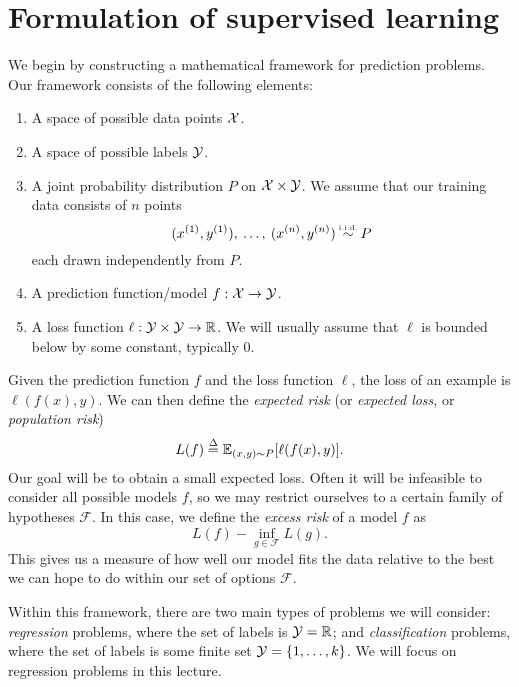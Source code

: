 \documentclass[]{subook}
\newcommand\iid{\stackrel{\mathclap{\tiny\normalfont\mbox{i.i.d.}}}{\sim}}
\newcommand\defn{\stackrel{\mathclap{\tiny\Delta}}{=}}
\newcommand\E{\mathbb{E}}
\begin{document}
\section{Formulation of supervised learning}
We begin by constructing a mathematical framework for prediction problems. Our framework consists of the following elements:
\begin{enumerate}
	\item A space of possible data points $\mathcal{X}$.
	\item A space of possible labels $\mathcal{Y}$.
	\item A joint probability distribution $P$ on $\mathcal{X}\times \mathcal{Y}$. We assume that our training data consists of $n$ points $$(x^{(1)}, y^{(1)}), \: \ldots, \: (x^{(n)}, y^{(n)}) \: \iid \: P$$ each drawn independently from $P$.
	\item A prediction function/model $f: \mathcal{X}\rightarrow \mathcal{Y}$.
	\item A loss function $\ell: \mathcal{Y}\times \mathcal{Y}\rightarrow \mathbb{R}$. We will usually assume that $\ell$ is bounded below by some constant, typically $0$.
\end{enumerate}
Given the prediction function $f$ and the loss function $\ell$, the loss of an example is $\ell(f(x),y)$. We can then define the \textit{expected risk} (or \textit{expected loss}, or \textit{population risk})
$$L(f) \defn \E_{(x,y)\sim P} [\ell(f(x),y)].$$ Our goal will be to obtain a small expected loss. Often it will be infeasible to consider all possible models $f$, so we may restrict ourselves to a certain family of hypotheses $\mathcal{F}$. In this case, we define the \textit{excess risk} of a model $f$ as $$L(f) - \inf_{g\in\mathcal{F}} L(g).$$ This gives us a measure of how well our model fits the data relative to the best we can hope to do within our set of options $\mathcal{F}$.

Within this framework, there are two main types of problems we will consider: \textit{regression} problems, where the set of labels is $\mathcal{Y}=\mathbb{R}$; and \textit{classification} problems, where the set of labels is some finite set $\mathcal{Y}=\{1,\ldots,k\}$. We will focus on regression problems in this lecture.
\end{document}
